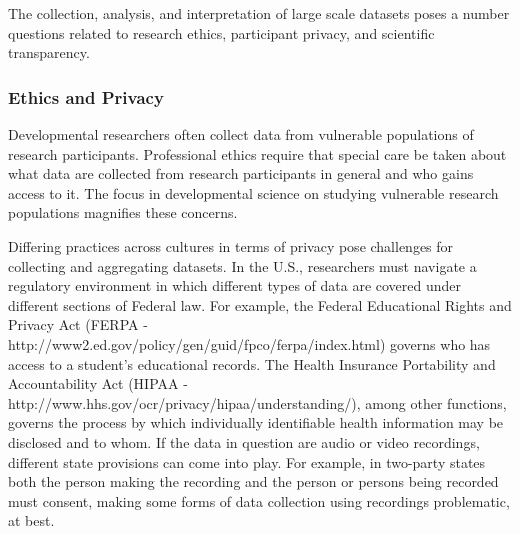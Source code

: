 \documentclass[letterpaper,man,apacite]{apa6}
\begin{document}
The collection, analysis, and interpretation of large scale datasets poses a number questions related to research ethics, participant privacy, and scientific transparency.

\subsubsection{Ethics and Privacy}

Developmental researchers often collect data from vulnerable populations of research participants.
Professional ethics require that special care be taken about what data are collected from research participants in general and who gains access to it.
The focus in developmental science on studying vulnerable research populations magnifies these concerns.

Differing practices across cultures in terms of privacy pose challenges for collecting and aggregating datasets.
In the U.S., researchers must navigate a regulatory environment in which different types of data are covered under different sections of Federal law.
For example, the Federal Educational Rights and Privacy Act (FERPA - http://www2.ed.gov/policy/gen/guid/fpco/ferpa/index.html) governs who has access to a student's educational records.
The Health Insurance Portability and Accountability Act (HIPAA - http://www.hhs.gov/ocr/privacy/hipaa/understanding/), among other functions, governs the process by which individually identifiable health information may be disclosed and to whom.
If the data in question are audio or video recordings, different state provisions can come into play.
For example, in two-party states \cite{DMLP} both the person making the recording and the person or persons being recorded must consent, making some forms of data collection using recordings problematic, at best.
\end{document}

